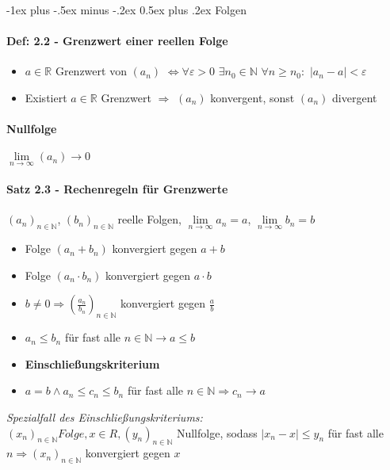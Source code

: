 \documentclass[paper=a3,paper=landscape, fontsize=9pt,DIV=25]{scrartcl}
\makeatletter
\newcommand{\real}{{\mathbb{R}}}
\newcommand{\nat}{\mathbb{N}}
\renewcommand{\section}{\@startsection{section}{1}{0mm}%
  {-1ex plus -.5ex minus -.2ex}%
  {0.5ex plus .2ex}%
  {\color{blue}\normalfont\large\bfseries}}
\makeatother
\begin{document}
\begin{multicols*}{4}
  \section{Folgen}
  \paragraph{Def: 2.2 - Grenzwert einer reellen Folge}
  \begin{itemize}
  \item $a \in \real$ Grenzwert von $(a_n)$ $\Leftrightarrow \forall \varepsilon > 0$ $\exists n_0 \in \nat$ $\forall n \geq n_0:$ $|a_n - a| < \varepsilon$
  \item Existiert $a \in \real$ Grenzwert $\Rightarrow$ $(a_n)$ konvergent, sonst $(a_n)$ divergent
  \end{itemize}

  \paragraph{Nullfolge}
$\lim\limits_{n \rightarrow \infty} (a_n) \rightarrow 0$

  \paragraph{Satz 2.3 - Rechenregeln für Grenzwerte}
  $(a_n)_{n \in \nat}$, $(b_n)_{n \in \nat}$ reelle Folgen, $\lim\limits_{n \rightarrow \infty} a_n = a$, $\lim\limits_{n \rightarrow \infty} b_n = b$
  \begin{itemize}
  \item Folge $(a_n + b_n)$ konvergiert gegen $a+b$
  \item Folge $(a_n \cdot b_n)$ konvergiert gegen $a \cdot b$
  \item $b \neq 0 \Rightarrow (\frac{a_n}{b_n})_{n \in \nat}$ konvergiert gegen $\frac{a}{b}$
  \item $a_n \leq b_n$ für fast alle $n \in \nat \rightarrow a \leq b$
  \item \textbf{Einschließungskriterium} \item $a=b \wedge a_n \leq c_n \leq b_n$ für fast alle $n \in \nat \Rightarrow c_n \rightarrow a$
  \end{itemize}

  \textit{Spezialfall des Einschließungskriteriums:}\\$(x_n)_{n \in \nat} Folge, x \in R, (y_n)_{n \in \nat}$ Nullfolge, sodass $|x_n -x| \leq y_n$ für fast alle $n \Rightarrow (x_n)_{n \in \nat}$ konvergiert gegen $x$



\end{multicols*}
\end{document}
